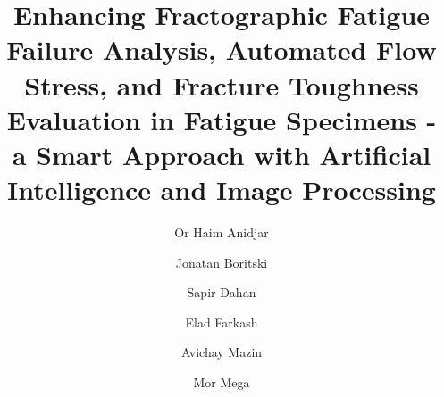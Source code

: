 \documentclass[preprint,12pt]{elsarticle}
\begin{document}
\begin{frontmatter}



\title{Enhancing Fractographic Fatigue Failure Analysis, Automated Flow Stress, and Fracture Toughness Evaluation in Fatigue Specimens - a Smart Approach with Artificial Intelligence and Image Processing}

\author[Computer_b]{Or Haim Anidjar}
\author[Computer_a]{Jonatan Boritski}
\author[Computer_a]{Sapir Dahan}
\author[soreq]{Elad Farkash}
\author[Computer_a]{Avichay Mazin}
\author[fracture]{Mor Mega}




\end{frontmatter}
\end{document}
